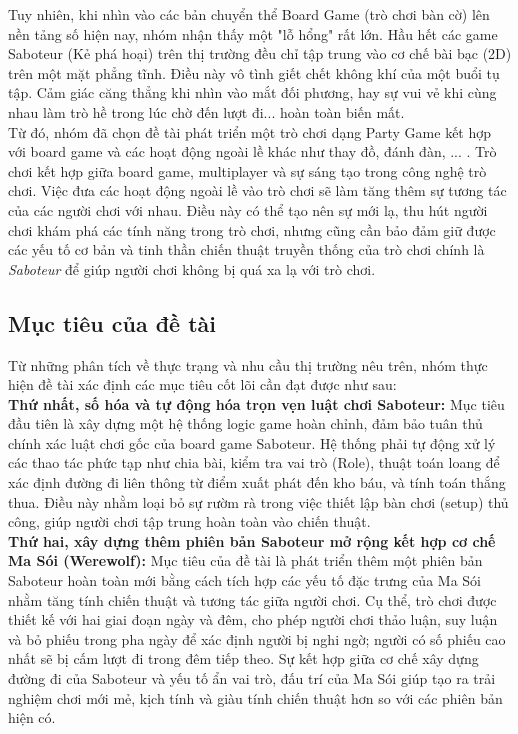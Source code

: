     Tuy nhiên, khi nhìn vào các bản chuyển thể Board Game (trò chơi bàn cờ) lên nền tảng số hiện nay, nhóm nhận thấy một "lỗ hổng" rất lớn. Hầu hết các game Saboteur (Kẻ phá hoại) trên thị trường đều chỉ tập trung vào cơ chế bài bạc (2D) trên một mặt phẳng tĩnh. Điều này vô tình giết chết không khí của một buổi tụ tập. Cảm giác căng thẳng khi nhìn vào mắt đối phương, hay sự vui vẻ khi cùng nhau làm trò hề trong lúc chờ đến lượt đi... hoàn toàn biến mất.  \\
    
    Từ đó, nhóm đã chọn đề tài phát triển một trò chơi dạng Party Game kết hợp với board game và các hoạt động ngoài lề khác như thay đồ, đánh đàn, ... . Trò chơi kết hợp giữa board game, multiplayer và sự sáng tạo trong công nghệ trò chơi. Việc đưa các hoạt động ngoài lề vào trò chơi sẽ làm tăng thêm sự tương tác của các người chơi với nhau. Điều này có thể tạo nên sự mới lạ, thu hút người chơi khám phá các tính năng trong trò chơi, nhưng cũng cần bảo đảm giữ được các yếu tố cơ bản và tinh thần chiến thuật truyền thống của trò chơi chính là \textit{Saboteur} để giúp người chơi không bị quá xa lạ với trò chơi.





\subsection{Mục tiêu của đề tài}
    Từ những phân tích về thực trạng và nhu cầu thị trường nêu trên, nhóm thực hiện đề tài xác định các mục tiêu cốt lõi cần đạt được như sau:\\

    \textbf{Thứ nhất, số hóa và tự động hóa trọn vẹn luật chơi Saboteur:}
    Mục tiêu đầu tiên là xây dựng một hệ thống logic game hoàn chỉnh, đảm bảo tuân thủ chính xác luật chơi gốc của board game Saboteur. Hệ thống phải tự động xử lý các thao tác phức tạp như chia bài, kiểm tra vai trò (Role), thuật toán loang để xác định đường đi liên thông từ điểm xuất phát đến kho báu, và tính toán thắng thua. Điều này nhằm loại bỏ sự rườm rà trong việc thiết lập bàn chơi (setup) thủ công, giúp người chơi tập trung hoàn toàn vào chiến thuật.\\
    
    \textbf{Thứ hai, xây dựng thêm phiên bản Saboteur mở rộng kết hợp cơ chế Ma Sói (Werewolf):} Mục tiêu của đề tài là phát triển thêm một phiên bản Saboteur hoàn toàn mới bằng cách tích hợp các yếu tố đặc trưng của Ma Sói nhằm tăng tính chiến thuật và tương tác giữa người chơi. Cụ thể, trò chơi được thiết kế với hai giai đoạn ngày và đêm, cho phép người chơi thảo luận, suy luận và bỏ phiếu trong pha ngày để xác định người bị nghi ngờ; người có số phiếu cao nhất sẽ bị cấm lượt đi trong đêm tiếp theo. Sự kết hợp giữa cơ chế xây dựng đường đi của Saboteur và yếu tố ẩn vai trò, đấu trí của Ma Sói giúp tạo ra trải nghiệm chơi mới mẻ, kịch tính và giàu tính chiến thuật hơn so với các phiên bản hiện có.\\
    
